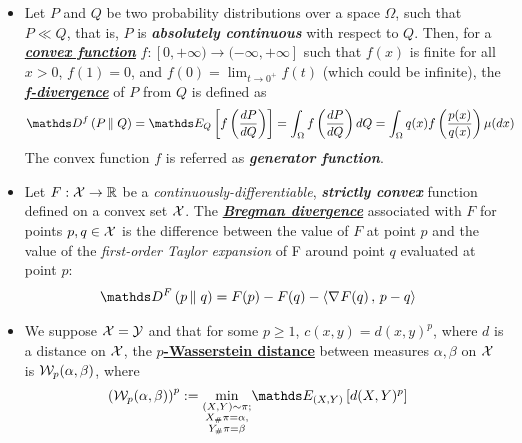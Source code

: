 \documentclass[11pt]{article}
\begin{document}
\begin{itemize}
\item   \begin{definition}
Let $P$ and $Q$ be two probability distributions over a space $\Omega$, such that  $P\ll Q$, that is, $P$ is \emph{\textbf{absolutely continuous}} with respect to $Q$. Then, for a \underline{\emph{\textbf{convex function}}}  $f: [0, +\infty)\to (-\infty ,+\infty]$ such that $f(x)$ is finite for all $x>0$, \underline{$f(1)=0$}, and  \underline{$f(0)=\lim _{t\to 0^{+}}f(t)$} (which could be infinite), the \underline{\emph{\textbf{f-divergence}}} of $P$ from $Q$ is defined as
\begin{align}
\divg{f}{P}{Q} &= \E{Q}{f\paren{\frac{dP}{dQ}}} =  \int_{\Omega} f\paren{\frac{dP}{dQ}} dQ  =  \int_{\Omega} q(x) f\paren{\frac{p(x)}{q(x)}} \mu(dx)  \label{eqn: f_divg}
\end{align} The convex function $f$ is referred as \emph{\textbf{generator function}}.
\end{definition}

\item \begin{definition}
Let $F: {\mathcal X} \rightarrow {\mathbb R}$ be a \emph{continuously-differentiable}, \emph{\textbf{strictly convex}} function defined on a convex set ${\mathcal X}$. The \underline{\textbf{\emph{Bregman divergence}}} associated with $F$ for points $p,q \in {\mathcal X}$ is the difference between the value of $F$ at point $p$ and the value of the \emph{first-order Taylor expansion} of F around point $q$ evaluated at point $p$:
\begin{align}
\divg{F}{p}{q} &= F(p) - F(q) - \inn{\grad{}{F}(q)}{p - q} \label{eqn: bregman_divg}
\end{align}
\end{definition}

\item \begin{definition}
We suppose ${\mathcal X} = {\mathcal Y}$ and that for some $p \ge 1$, $c(x,y)= d(x,y)^p$, where $d$ is a distance on ${\mathcal X}$,  the \underline{\textbf{$p$-Wasserstein distance}} between measures $\alpha, \beta$ on ${\mathcal X}$ is ${\mathcal W}_{p}(\alpha, \beta)$, where
\begin{align}
\paren{\cW_{p}(\alpha, \beta)}^{p}:= \min_{\substack{(X, Y) \sim \pi; \\ X_{\#}\pi = \alpha,\\ Y_{\#}\pi = \beta}}& \E{(X,Y)}{d(X, Y)^{p}}\label{eqn: wasserstein_dist}
\end{align}
\end{definition}
\end{itemize}
\end{document}
